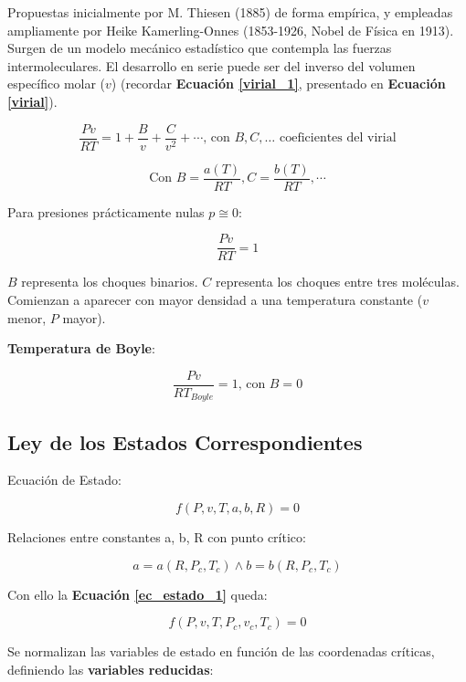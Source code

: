     Propuestas inicialmente por M. Thiesen (1885) de forma empírica, y empleadas ampliamente por Heike Kamerling-Onnes (1853-1926, Nobel de Física en 1913). Surgen de un modelo mecánico estadístico que contempla las fuerzas intermoleculares. El desarrollo en serie puede ser del inverso del volumen específico molar (\(v\)) (recordar \textbf{Ecuación \ref{virial_1}}, presentado en \textbf{Ecuación \ref{virial}}).
    
    \begin{equation}
    \label{virial}
        \frac{Pv}{RT} = 1 + \frac{B}{v} + \frac{C}{v^{2}} + \cdots \text{, con } B,C,\dots\text{ coeficientes del virial}
    \end{equation}
    
    \[\text{Con } B=\frac{a(T)}{RT}, C=\frac{b(T)}{RT}, \cdots\]
    
    Para presiones prácticamente nulas \(p \cong 0\):
    
    \[\frac{Pv}{RT}=1\]
    
    \(B\) representa los choques binarios. \(C\) representa los choques entre tres moléculas. Comienzan a aparecer con mayor densidad a una temperatura constante (\(v\) menor, \(P\) mayor).
    
    \textbf{Temperatura de Boyle}:
    
    \[\frac{Pv}{RT_{Boyle}} = 1 \text{, con }B=0\]
    
    \subsection{Ley de los Estados Correspondientes}
    
    Ecuación de Estado:
    
    \begin{equation}
    \label{ec_estado_1}
        f(P,v,T,a,b,R)=0
    \end{equation}
    
    Relaciones entre constantes a, b, R con punto crítico:
    
    \[a=a(R,P_{c},T_{c}) \wedge b=b(R,P_{c},T_{c})\]

    
    Con ello la \textbf{Ecuación \ref{ec_estado_1}} queda:
    
    \begin{equation}
    \label{ec_estado_2}
        f(P,v,T,P_{c},v_{c},T_{c})=0
    \end{equation}
    
    Se normalizan las variables de estado en función de las coordenadas críticas, definiendo las \textbf{variables reducidas}:
    

